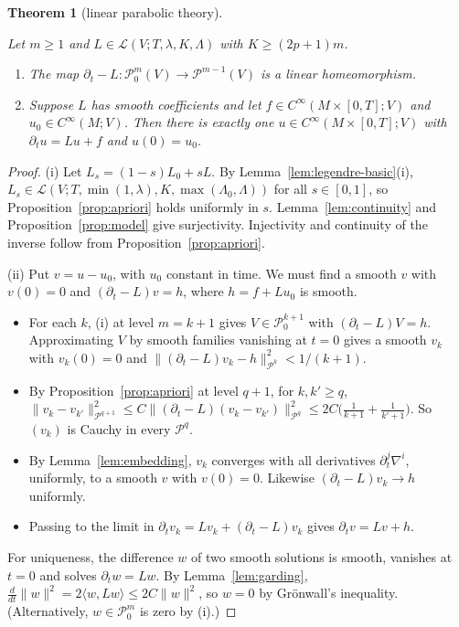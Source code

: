 \documentclass[11pt,reqno]{amsart}
\newtheorem{theorem}{Theorem}[section]
\theoremstyle{definition}
\theoremstyle{remark}
\newcommand{\Pp}{\mathcal{P}}
\newcommand{\Lcl}{\mathcal{L}}
\newcommand{\ip}[2]{\langle #1,#2\rangle}
\newcommand{\norm}[1]{\lVert #1\rVert}
\newcommand{\lean}[1]{}
\newcommand{\uses}[1]{}
\numberwithin{equation}{section}
\begin{document}
\begin{theorem}[linear parabolic theory]\label{thm:linear}
\lean{ShortTime.LinearOp.exists_smooth, ShortTime.LinearOp.unique_of_isParabolic, ShortTime.LinearOp.isomorphism, ShortTime.LinearOp.isomorphism_of_base, ShortTime.LinearOp.heatExt, ShortTime.LinearOp.norm_le_heatExt_lerp, ShortTime.LinearOp.exists_approx, ShortTime.LinearOp.exists_smooth_zero}
\uses{def:class, def:parabolic}
Let $m\ge1$ and $L\in\Lcl(V;T,\lambda,K,\Lambda)$ with $K\ge(2p+1)m$.
\begin{enumerate}[label=(\roman*),nosep]
\item The map $\partial_t-L\colon\Pp^m_0(V)\to\Pp^{m-1}(V)$ is a linear homeomorphism.
\item Suppose $L$ has smooth coefficients and let $f\in C^\infty(M\times[0,T];V)$ and
  $u_0\in C^\infty(M;V)$. Then there is exactly one $u\in C^\infty(M\times[0,T];V)$ with
  $\partial_tu=Lu+f$ and $u(0)=u_0$.
\end{enumerate}
\end{theorem}

\begin{proof}
\uses{prop:model, prop:apriori, lem:continuity, lem:legendre-basic, lem:embedding, lem:garding}
(i) Let $L_s=(1-s)L_0+sL$. By Lemma~\ref{lem:legendre-basic}(i),
$L_s\in\Lcl(V;T,\min(1,\lambda),K,\max(\Lambda_0,\Lambda))$ for all $s\in[0,1]$, so
Proposition~\ref{prop:apriori} holds uniformly in $s$. Lemma~\ref{lem:continuity} and
Proposition~\ref{prop:model} give surjectivity. Injectivity and continuity of the inverse follow from
Proposition~\ref{prop:apriori}.

(ii) Put $v=u-u_0$, with $u_0$ constant in time. We must find a smooth $v$ with $v(0)=0$ and
$(\partial_t-L)v=h$, where $h=f+Lu_0$ is smooth.
\begin{itemize}[nosep]
\item For each $k$, (i) at level $m=k+1$ gives $V\in\Pp^{k+1}_0$ with $(\partial_t-L)V=h$. Approximating
  $V$ by smooth families vanishing at $t=0$ gives a smooth $v_k$ with $v_k(0)=0$ and
  $\norm{(\partial_t-L)v_k-h}^2_{\Pp^k}<1/(k+1)$.
\item By Proposition~\ref{prop:apriori} at level $q+1$, for $k,k'\ge q$,
  $\norm{v_k-v_{k'}}^2_{\Pp^{q+1}}\le C\norm{(\partial_t-L)(v_k-v_{k'})}^2_{\Pp^q}
  \le 2C\bigl(\tfrac1{k+1}+\tfrac1{k'+1}\bigr)$. So $(v_k)$ is Cauchy in every $\Pp^q$.
\item By Lemma~\ref{lem:embedding}, $v_k$ converges with all derivatives $\partial_t^j\nabla^i$,
  uniformly, to a smooth $v$ with $v(0)=0$. Likewise $(\partial_t-L)v_k\to h$ uniformly.
\item Passing to the limit in $\partial_tv_k=Lv_k+(\partial_t-L)v_k$ gives $\partial_tv=Lv+h$.
\end{itemize}
For uniqueness, the difference $w$ of two smooth solutions is smooth, vanishes at $t=0$ and solves
$\partial_tw=Lw$. By Lemma~\ref{lem:garding},
$\frac{d}{dt}\norm{w}^2=2\ip{w}{Lw}\le2C\norm w^2$, so $w=0$ by Gr\"onwall's inequality. (Alternatively,
$w\in\Pp^m_0$ is zero by (i).)
\end{proof}
\end{document}
